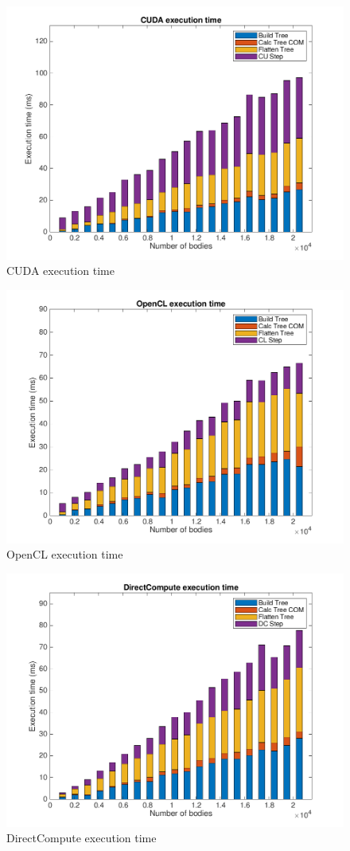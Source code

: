 \begin{figure}[H]
    \centering
    \includegraphics[width=.8\textwidth]{Results/Figs/CUDABarChart.png}
    \caption{CUDA execution time}
    \label{fig:CUDAExecTime}
\end{figure}

\begin{figure}[H]
    \centering
    \includegraphics[width=.8\textwidth]{Results/Figs/OpenCLBarChart.png}
    \caption{OpenCL execution time}
    \label{fig:OpenCLExecTime}
\end{figure}

\begin{figure}[H]
    \centering  
    \includegraphics[width=.8\textwidth]{Results/Figs/DirectComputeBarChart.png}
    \caption{DirectCompute execution time}
    \label{fig:DirectComputeExecTime}
\end{figure}

